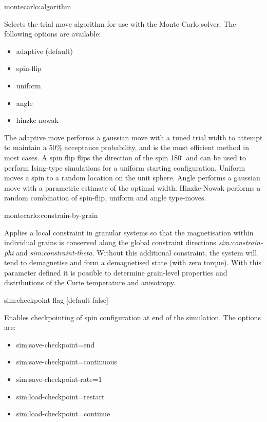 {\zicf montecarlo:algorithm}
Selects the trial move algorithm for use with the Monte Carlo solver. The
following options are available:

\begin{itemize}
  \item[] adaptive (default)
  \item[] spin-flip
  \item[] uniform
  \item[] angle
  \item[] hinzke-nowak
\end{itemize}

The adaptive move performs a gaussian move with a tuned trial width to attempt
to maintain a 50\% acceptance probability, and is the most efficient method in
most cases. A spin flip flips the direction of the spin 180$^{\circ}$ and can be
used to perform Ising-type simulations for a uniform starting configuration.
Uniform moves a spin to a random location on the unit sphere. Angle performs a
gaussian move with a parametric estimate of the optimal width. Hinzke-Nowak
performs a random combination of spin-flip, uniform and angle type-moves.

{\zicf montecarlo:constrain-by-grain}
Applies a local constraint in granular systems so that the magnetisation within
individual grains is conserved along the global constraint directions
\textit{sim:constrain-phi} and \textit{sim:constraint-theta}. Without this
additional constraint, the system will tend to demagnetise and form a
demagnetised state (with zero torque). With this parameter defined it is
possible to determine grain-level properties and distributions of the Curie
temperature and anisotropy.

{\zicf sim:checkpoint flag [default false]} Enables checkpointing of spin configuration at end of the simulation. The options are:

\begin{itemize}
  \item[] sim:save-checkpoint=end
  \item[] sim:save-checkpoint=continuous
  \item[] sim:save-checkpoint-rate=1
  \item[] sim:load-checkpoint=restart
  \item[] sim:load-checkpoint=continue
\end{itemize}

